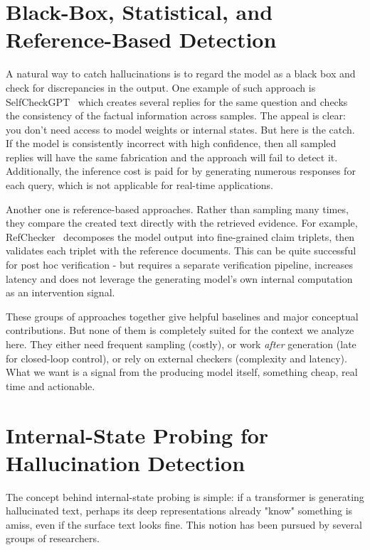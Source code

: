 \section{Black-Box, Statistical, and Reference-Based Detection}
\label{sec:lit_blackbox}

A natural way to catch hallucinations is to regard the model as a black box and check for discrepancies in the output. One example of such approach is SelfCheckGPT~\cite{manakul2023selfcheckgpt} which creates several replies for the same question and checks the consistency of the factual information across samples. The appeal is clear: you don't need access to model weights or internal states. But here is the catch. If the model is consistently incorrect with high confidence, then all sampled replies will have the same fabrication and the approach will fail to detect it. Additionally, the inference cost is paid for by generating numerous responses for each query, which is not applicable for real-time applications.

Another one is reference-based approaches. Rather than sampling many times, they compare the created text directly with the retrieved evidence. For example, RefChecker~\cite{hu2024refchecker} decomposes the model output into fine-grained claim triplets, then validates each triplet with the reference documents. This can be quite successful for post hoc verification - but requires a separate verification pipeline, increases latency and does not leverage the generating model's own internal computation as an intervention signal.

These groups of approaches together give helpful baselines and major conceptual contributions. But none of them is completely suited for the context we analyze here. They either need frequent sampling (costly), or work \emph{after} generation (late for closed-loop control), or rely on external checkers (complexity and latency). What we want is a signal from the producing model itself, something cheap, real time and actionable.

\section{Internal-State Probing for Hallucination Detection}
\label{sec:lit_probing}

The concept behind internal-state probing is simple: if a transformer is generating hallucinated text, perhaps its deep representations already "know" something is amiss, even if the surface text looks fine. This notion has been pursued by several groups of researchers.

